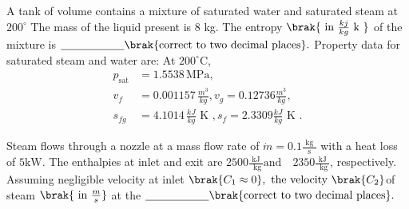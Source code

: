 \bigskip
\item A tank of volume  contains a mixture of saturated water and saturated steam at $200^{\circ}$ The mass of the liquid present is 8 kg. The entropy $\brak{\text{ in }\frac{kj}{kg} \text{ k }}$  of the mixture is  $\underline{\hspace{2cm}} \brak{\text{correct to two decimal places}}.$
Property data for saturated steam and water are:
At $200^\circ \text{C}$,
\begin{align*}
p_{\text{sat}} &= 1.5538 \, \text{MPa}, \\
v_f &= 0.001157 \, \frac{m^{3}}{kg}, v_g = 0.12736 \frac{m^{3}}{kg}, \\
s_{fg} &= 4.1014 \, \frac{kJ}{kg}\text{ K }, s_f = 2.3309 \frac{kJ}{kg}\text{ K }.
\end{align*}
\bigskip
\item Steam flows through a nozzle at a mass flow rate of $\dot{m} = 0.1 \frac{\text{ kg }}{\text{ s }} $  with a heat loss of $5 \text{kW}$. The enthalpies at inlet and exit are $2500 \frac{\text{ kJ }}{\text{ kg}}  \text{and} \quad 2350 \frac{\text{ kJ }}{\text{ kg}} $, respectively. Assuming negligible velocity at inlet $\brak{C_{1}\approx 0},\text{ the velocity }\brak{C_{2}}$of steam $\brak{\text{ in }\frac{m}{s}}$  at the $\underline{\hspace{2cm}} \brak{\text{correct to two decimal places}}.$
\begin{figure}[H]
\centering
{}%

\end{figure}

